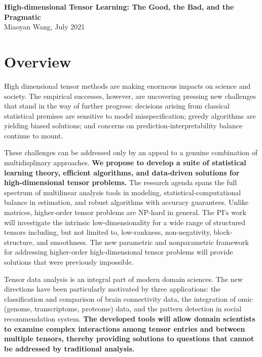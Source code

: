 \documentclass[11pt]{article}
\theoremstyle{exampstyle}
\theoremstyle{definition}
\begin{document}
\begin{center}
{\bf \large High-dimensional Tensor Learning: The Good, the Bad, and the Pragmatic}\\
\vspace{.1cm}
Miaoyan Wang, July 2021
\end{center}
\vspace{-.5cm}
\section*{Overview}
\vspace{-.5cm}
High dimensional tensor methods are making enormous impacts on science and society. The empirical successes, however, are uncovering pressing new challenges that stand in the way of further progress: decisions arising from classical statistical premises are sensitive to model misspecification; greedy algorithms are yielding biased solutions; and concerns on prediction-interpretability balance continue to mount. 


These challenges can be addressed only by an appeal to a genuine combination of multidisplinary approaches. {\bf We propose to develop a suite of statistical learning theory, efficient algorithms, and data-driven solutions for high-dimensional tensor problems.} The research agenda spans the full spectrum of multilinear analysis tools in modeling, statistical-computational balance in estimation, and robust algorithms with accuracy guarantees. Unlike matrices, higher-order tensor problems are NP-hard in general. The PI's work will investigate the intrinsic low-dimensionality for a wide range of structured tensors including, but not limited to, low-rankness, non-negativity, block-structure, and smoothness. The new parametric and nonparametric framework for addressing higher-order high-dimensional tensor problems will provide solutions that were previously impossible. 

Tensor data analysis is an integral part of modern domain sciences. The new directions have been particularly motivated by three applications: the classification and comparison of brain connectivity data, the integration of omic (genome, transcriptome, proteome) data, and the pattern detection in social recommendation system. {\bf The developed tools will allow domain scientists to examine complex interactions among tensor entries and between multiple tensors, thereby providing solutions to questions that cannot be addressed by traditional analysis.} 
\end{document}
